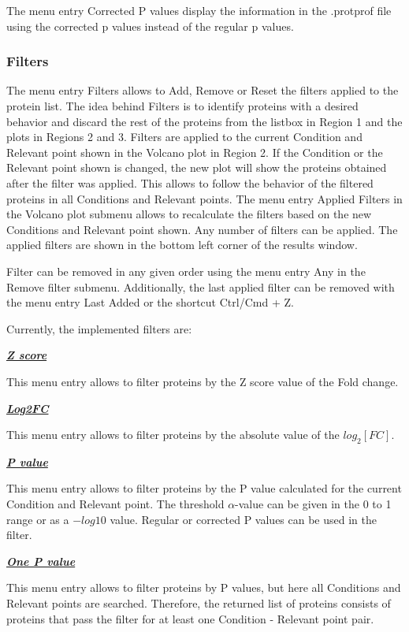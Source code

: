 The menu entry Corrected P values display the information in the .protprof file using the corrected p values instead of the regular p values.

\subsubsection{Filters}

The menu entry Filters allows to Add, Remove or Reset the filters applied to the protein list. The idea behind Filters is to identify proteins with a desired behavior and discard the rest of the proteins from the listbox in Region \num{1} and the plots in Regions \num{2} and \num{3}. Filters are applied to the current Condition and Relevant point shown in the Volcano plot in Region \num{2}. If the Condition or the Relevant point shown is changed, the new plot will show the proteins obtained after the filter was applied. This allows to follow the behavior of the filtered proteins in all Conditions and Relevant points. The menu entry Applied Filters in the Volcano plot submenu allows to recalculate the filters based on the new Conditions and Relevant point shown. Any number of filters can be applied. The applied filters are shown in the bottom left corner of the results window. 

Filter can be removed in any given order using the menu entry Any in the Remove filter submenu. Additionally, the last applied filter can be removed with the menu entry Last Added or the shortcut Ctrl/Cmd + Z.

Currently, the implemented filters are:

\textbf{\textit{\underline{Z score}}}

This menu entry allows to filter proteins by the Z score value of the Fold change. 

\textbf{\textit{\underline{Log2FC}}}

This menu entry allows to filter proteins by the absolute value of the $log_2[FC]$. 

\textbf{\textit{\underline{P value}}}

This menu entry allows to filter proteins by the P value calculated for the current Condition and Relevant point. The threshold $\alpha$-value can be given in the 0 to 1 range or as a $-log10$ value. Regular or corrected P values can be used in the filter.

\textbf{\textit{\underline{One P value}}}

This menu entry allows to filter proteins by P values, but here all Conditions and Relevant points are searched. Therefore, the returned list of proteins consists of proteins that pass the filter for at least one Condition - Relevant point pair.

